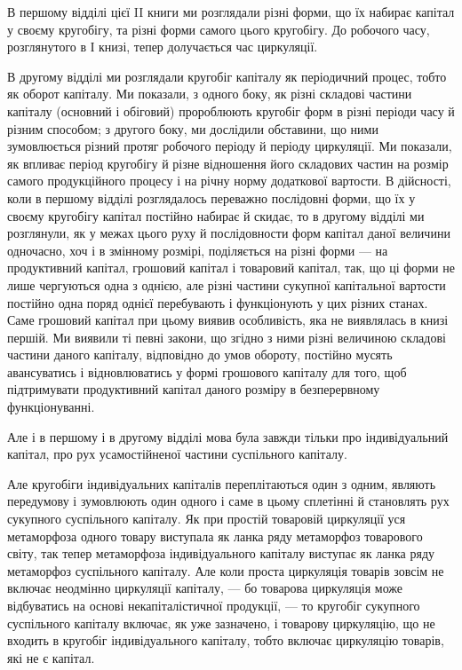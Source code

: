 В першому відділі цієї II книги ми розглядали різні форми, що їх
набирає капітал у своєму кругобігу, та різні форми самого цього кругобігу.
До робочого часу, розглянутого в І книзі, тепер долучається час
циркуляції.

В другому відділі ми розглядали кругобіг капіталу як періодичний
процес, тобто як оборот капіталу. Ми показали, з одного боку, як різні
складові частини капіталу (основний і обіговий) пророблюють кругобіг форм
в різні періоди часу й різним способом; з другого боку, ми дослідили обставини,
що ними зумовлюється різний протяг робочого періоду й періоду
циркуляції. Ми показали, як впливає період кругобігу й різне відношення
його складових частин на розмір самого продукційного процесу і на
річну норму додаткової вартости. В дійсності, коли в першому відділі
розглядалось переважно послідовні форми, що їх у своєму кругобігу капітал
постійно набирає й скидає, то в другому відділі ми розглянули, як
у межах цього руху й послідовности форм капітал даної величини одночасно,
хоч і в змінному розмірі, поділяється на різні форми — на продуктивний
капітал, грошовий капітал і товаровий капітал, так, що ці
форми не лише чергуються одна з однією, але різні частини сукупної
капітальної вартости постійно одна поряд однієї перебувають і функціонують
у цих різних станах. Саме грошовий капітал при цьому виявив
особливість, яка не виявлялась в книзі першій. Ми виявили ті певні закони,
що згідно з ними різні величиною складові частини даного капіталу,
відповідно до умов обороту, постійно мусять авансуватись і відновлюватись
у формі грошового капіталу для того, щоб підтримувати
продуктивний капітал даного розміру в безперервному функціонуванні.

Але і в першому і в другому відділі мова була завжди тільки про індивідуальний
капітал, про рух усамостійненої частини суспільного капіталу.

Але кругобіги індивідуальних капіталів переплітаються один з одним,
являють передумову і зумовлюють один одного і саме в цьому сплетінні
й становлять рух сукупного суспільного капіталу. Як при простій товаровій
циркуляції уся метаморфоза одного товару виступала як ланка
ряду метаморфоз товарового світу, так тепер метаморфоза індивідуального
капіталу виступає як ланка ряду метаморфоз суспільного капіталу. Але
коли проста циркуляція товарів зовсім не включає неодмінно циркуляції
капіталу, — бо товарова циркуляція може відбуватись на основі некапіталістичної
продукції, — то кругобіг сукупного суспільного капіталу включає,
як уже зазначено, і товарову циркуляцію, що не входить в кругобіг
індивідуального капіталу, тобто включає циркуляцію товарів, які не є
капітал.

